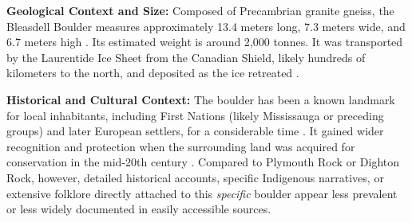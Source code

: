 \textbf{Geological Context and Size:} Composed of Precambrian granite gneiss, the Bleasdell Boulder measures approximately 13.4 meters long, 7.3 meters wide, and 6.7 meters high \cite{LTCBleasdell}. Its estimated weight is around 2,000 tonnes. It was transported by the Laurentide Ice Sheet from the Canadian Shield, likely hundreds of kilometers to the north, and deposited as the ice retreated \cite{Chapman1984}.

\textbf{Historical and Cultural Context:} The boulder has been a known landmark for local inhabitants, including First Nations (likely Mississauga or preceding groups) and later European settlers, for a considerable time \cite{Chapman1984}. It gained wider recognition and protection when the surrounding land was acquired for conservation in the mid-20th century \cite{LTCBleasdell}. Compared to Plymouth Rock or Dighton Rock, however, detailed historical accounts, specific Indigenous narratives, or extensive folklore directly attached to this \emph{specific} boulder appear less prevalent or less widely documented in easily accessible sources.

